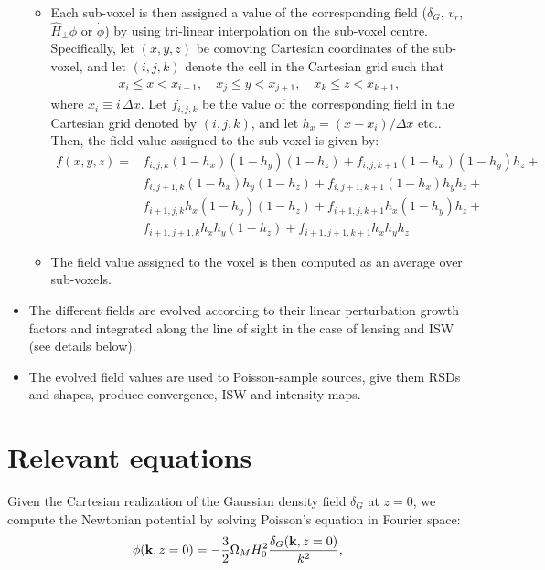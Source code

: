 \documentclass[a4paper,10pt]{article}
\begin{document}
\begin{itemize}
\begin{itemize}
        \item Each sub-voxel is then assigned a value of the corresponding field
          ($\delta_G$, $v_r$, $\hat{H}_\perp\phi$ or $\dot{\phi}$) by using
          tri-linear interpolation on the sub-voxel centre. Specifically, let
          $(x,y,z)$ be comoving Cartesian coordinates of the sub-voxel, and let
          $(i,j,k)$ denote the cell in the Cartesian grid such that
          \begin{align}
            x_i\leq x<x_{i+1},\hspace{12pt}x_j\leq y<x_{j+1},\hspace{12pt}
            x_k\leq z<x_{k+1},
          \end{align}
          where $x_i\equiv i\,\Delta x$. Let $f_{i,j,k}$ be the value of the
          corresponding field in the Cartesian grid denoted by $(i,j,k)$, and
          let $h_x=(x-x_i)/\Delta x$ etc.. Then, the field value assigned to the sub-voxel
          is given by:
          \begin{align}
            f(x,y,z)=&
            f_{i,j,k}(1-h_x)(1-h_y)(1-h_z)+
            f_{i,j,k+1}(1-h_x)(1-h_y)h_z+\\
            &f_{i,j+1,k}(1-h_x)h_y(1-h_z)+
            f_{i,j+1,k+1}(1-h_x)h_yh_z+\\
            &f_{i+1,j,k}h_x(1-h_y)(1-h_z)+
            f_{i+1,j,k+1}h_x(1-h_y)h_z+\\
            &f_{i+1,j+1,k}h_xh_y(1-h_z)+
            f_{i+1,j+1,k+1}h_xh_yh_z
          \end{align}
        \item The field value assigned to the voxel is then computed as an average
          over sub-voxels.
      \end{itemize}
    \item The different fields are evolved according to their linear perturbation growth
      factors and integrated along the line of sight in the case of lensing and ISW (see 
      details below).
    \item The evolved field values are used to Poisson-sample sources, give them RSDs
      and shapes, produce convergence, ISW and intensity maps.
  \end{itemize}

\section{Relevant equations}
  Given the Cartesian realization of the Gaussian density field $\delta_G$ at $z=0$,
  we compute the Newtonian potential by solving Poisson's equation in Fourier space:
  \begin{equation}
    \phi({\bf k},z=0)=-\frac{3}{2}\Omega_MH_0^2\frac{\delta_G({\bf k},z=0)}{k^2},
  \end{equation}
\end{document}
